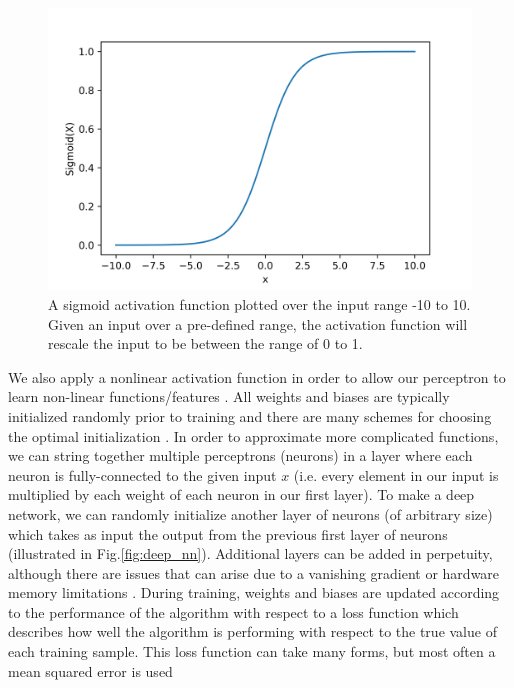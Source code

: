 \begin{figure}
    \centering
    \includegraphics[width=\linewidth]{figures/sigmoid_function.png}
    \caption{A sigmoid activation function plotted over the input 
    range -10 to 10. Given an input over a pre-defined range, the 
    activation function will rescale the input to be between the range 
    of 0 to 1.}
    \label{fig:sigmoid}
\end{figure}

We also apply a nonlinear activation function in order to allow our perceptron to learn non-linear functions/features \cite{1811.03378}. All weights and biases are typically initialized randomly prior to training and there are many schemes for choosing the optimal initialization \cite{1704.08863}. In order to approximate more complicated functions, we can string together multiple perceptrons (neurons) in a layer where each neuron is fully-connected to the given input $x$ (i.e. every element in our input is multiplied by each weight of each neuron in our first layer)\cite{Goodfellow-et-al-2016}. To make a deep network, we can randomly initialize another layer of neurons (of arbitrary size) which takes as input the output from the previous first layer of neurons (illustrated in Fig.\ref{fig:deep_nn}). Additional layers can be added in perpetuity, although there are issues that can arise due to a vanishing gradient or hardware memory limitations \cite{1211.5063}. During training, weights and biases are updated according to the performance of the algorithm with respect to a loss function which describes how well the algorithm is performing with respect to the true value of each training sample\cite{1702.05659}. This loss function can take many forms, but most often a mean squared error is used

